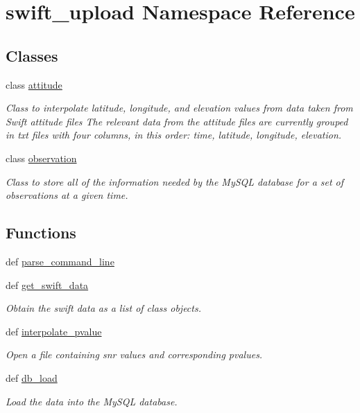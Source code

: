 \hypertarget{namespaceswift__upload}{\section{swift\-\_\-upload Namespace Reference}
\label{namespaceswift__upload}
}
\subsection*{Classes}
\begin{DoxyCompactItemize}
\item 
class \hyperlink{classswift__upload_1_1attitude}{attitude}
\begin{DoxyCompactList}\small\item\em Class to interpolate latitude, longitude, and elevation values from data taken from Swift attitude files The relevant data from the attitude files are currently grouped in txt files with four columns, in this order\-: time, latitude, longitude, elevation. \end{DoxyCompactList}\item 
class \hyperlink{classswift__upload_1_1observation}{observation}
\begin{DoxyCompactList}\small\item\em Class to store all of the information needed by the My\-S\-Q\-L database for a set of observations at a given time. \end{DoxyCompactList}\end{DoxyCompactItemize}
\subsection*{Functions}
\begin{DoxyCompactItemize}
\item 
def \hyperlink{namespaceswift__upload_afb3aeedcd6324609616af510e7d5ab77}{parse\-\_\-command\-\_\-line}
\item 
def \hyperlink{namespaceswift__upload_a9d72a96223b34f720ff10ded383a85f4}{get\-\_\-swift\-\_\-data}
\begin{DoxyCompactList}\small\item\em Obtain the swift data as a list of class objects. \end{DoxyCompactList}\item 
def \hyperlink{namespaceswift__upload_afd59363e3ba6ebbf496eba54eb48deab}{interpolate\-\_\-pvalue}
\begin{DoxyCompactList}\small\item\em Open a file containing snr values and corresponding pvalues. \end{DoxyCompactList}\item 
def \hyperlink{namespaceswift__upload_ae4b72aa67bc1f3f066e245971cee64b1}{db\-\_\-load}
\begin{DoxyCompactList}\small\item\em Load the data into the My\-S\-Q\-L database. \end{DoxyCompactList}\end{DoxyCompactItemize}
